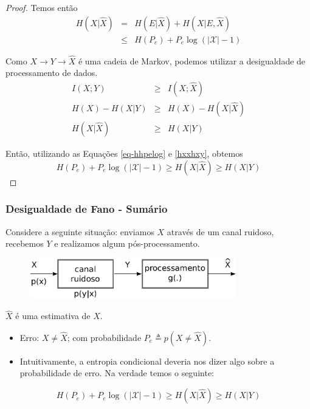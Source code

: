 \begin{frame}[allowframebreaks]
\begin{proof}
        \proofbreak

        Temos então
        \begin{eqnarray}\label{eq-hhpelog}
        H(X|\hat{X}) &=& H(E|\hat{X}) + H(X|E,\hat{X}) \nonumber \\
                &\leq& H(P_e) + P_e \log (\vert \mathcal{X} \vert - 1)
        \end{eqnarray}

        Como $X \rightarrow Y \rightarrow \hat{X}$ é uma cadeia de Markov, podemos utilizar a
        desigualdade de processamento de dados.
        \begin{eqnarray}\label{hxxhxy}
        I(X;Y) &\geq& I(X;\hat{X}) \nonumber \\
        H(X) - H(X|Y) &\geq& H(X) - H(X|\hat{X}) \nonumber \\
        H(X|\hat{X}) &\geq& H(X|Y)
        \end{eqnarray}

        \proofbreak

        Então, utilizando as Equações \ref{eq-hhpelog} e \ref{hxxhxy}, obtemos
        \begin{equation}
        H(P_e) + P_e \log (\vert \mathcal{X} \vert - 1) \geq H(X|\hat{X}) \geq H(X|Y)
        \end{equation}
        
  \end{proof}
\end{frame}

\begin{frame}%
  \frametitle{Desigualdade de Fano - Sumário}
  Considere a seguinte situação: enviamos $X$ através de um canal ruidoso,
  recebemos $Y$ e realizamos algum pós-processamento.
  \begin{figure}[h!]
  \centering
  \includegraphics[width=0.8\textwidth]{images/canal-ruidoso.pdf}
  \label{fig:canal-ruidoso}
  \end{figure}
  $\hat{X}$ é uma estimativa de $X$.
  \begin{itemize}
  \item Erro: $X\neq\hat{X}$; com probabilidade $P_e \triangleq p(X\neq \hat{X})$.
  \item Intuitivamente, a entropia condicional deveria nos dizer algo sobre a probabilidade de erro. 
        Na verdade temos o seguinte:
  \end{itemize}

  \begin{theorem}
  \begin{equation}
  H(P_e) + P_e \log (\vert \mathcal{X} \vert -1 ) \geq H(X|\hat{X}) \geq H(X|Y)
  \end{equation}
  \end{theorem}
\end{frame}

